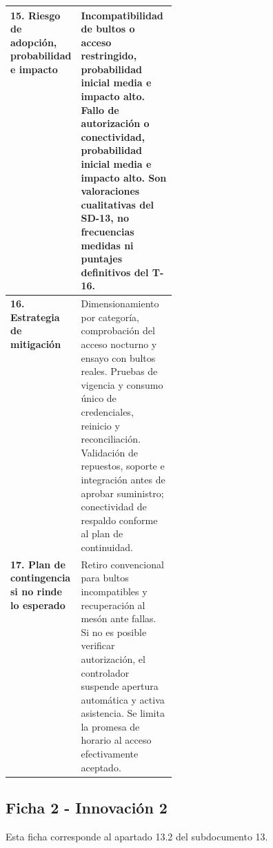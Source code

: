 \documentclass[11pt]{article}
\begin{document}
\begin{longtable}{@{}>{\raggedright\arraybackslash}p{0.28\linewidth}>{\raggedright\arraybackslash}p{}@{}}
\\
\midrule
\textbf{15. Riesgo de adopción, probabilidad e impacto}\label{riesgo-de-adopciuxf3n-probabilidad-e-impacto} &
Incompatibilidad de bultos o acceso restringido, probabilidad inicial media e impacto alto. Fallo de autorización o conectividad, probabilidad inicial media e impacto alto. Son valoraciones cualitativas del SD-13, no frecuencias medidas ni puntajes definitivos del T-16.
\\
\midrule
\textbf{16. Estrategia de mitigación}\label{estrategia-de-mitigaciuxf3n} &
Dimensionamiento por categoría, comprobación del acceso nocturno y ensayo con bultos reales. Pruebas de vigencia y consumo único de credenciales, reinicio y reconciliación. Validación de repuestos, soporte e integración antes de aprobar suministro; conectividad de respaldo conforme al plan de continuidad.
\\
\midrule
\textbf{17. Plan de contingencia si no rinde lo esperado}\label{plan-de-contingencia-si-no-rinde-lo-esperado} &
Retiro convencional para bultos incompatibles y recuperación al mesón ante fallas. Si no es posible verificar autorización, el controlador suspende apertura automática y activa asistencia. Se limita la promesa de horario al acceso efectivamente aceptado.
\\
\end{longtable}

\subsection*{Ficha 2 - Innovación 2}\label{ficha-2-innovaciuxf3n-2}

Esta ficha corresponde al apartado 13.2 del subdocumento 13.
\end{document}
